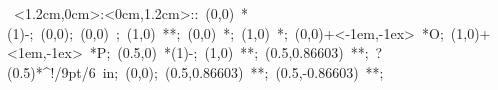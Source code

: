 %


\hbox{
\xy    <1.2cm,0cm>:<0cm,1.2cm>::
       (0,0) *\ellipse(1){-}; (0,0); 
       (0,0) ; (1,0) **\dir{-};
       (0,0) *{\bullet}; (1,0) *{\bullet};
       (0,0)+<-1em,-1ex> *{O}; (1,0)+<1em,-1ex> *{P};
       (0.5,0) *\ellipse(1){-}; 
       (1,0) **\dir{-}; (0.5,0.86603) **\dir{-}; ?(0.5)*^!/9pt/\hbox{6~in}; 
       (0,0); (0.5,0.86603) **\dir{-}; (0.5,-0.86603) **\dir{-};
\endxy}



